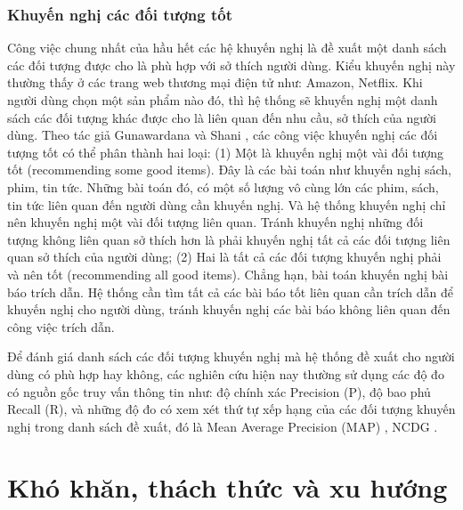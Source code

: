 \subsubsection{Khuyến nghị các đối tượng tốt}
Công việc chung nhất của hầu hết các hệ khuyến nghị là đề xuất một danh sách các đối tượng được cho là phù hợp với sở thích người dùng. Kiểu khuyến nghị này thường thấy ở các trang web thương mại điện tử như: Amazon, Netflix. Khi người dùng chọn một sản phẩm nào đó, thì hệ thống sẽ khuyến nghị một danh sách các đối tượng khác được cho là liên quan đến nhu cầu, sở thích của người dùng. Theo tác giả Gunawardana và Shani \cite{GunawardanaS09}, các công việc khuyến nghị các đối tượng tốt có thể phân thành hai loại: (1) Một là khuyến nghị một vài đối tượng tốt (recommending some good items). Đây là các bài toán như khuyến nghị sách, phim, tin tức. Những bài toán đó, có một số lượng vô cùng lớn các phim, sách, tin tức liên quan đến người dùng cần khuyến nghị. Và hệ thống khuyến nghị chỉ nên khuyến nghị một vài đối tượng liên quan. Tránh khuyến nghị những đối tượng không liên quan sở thích hơn là phải khuyến nghị tất cả các đối tượng liên quan sở thích của người dùng; (2) Hai là tất cả các đối tượng khuyến nghị phải và nên tốt (recommending all good items). Chẳng hạn, bài toán khuyến nghị bài báo trích dẫn. Hệ thống cần tìm tất cả các bài báo tốt liên quan cần trích dẫn để khuyến nghị cho người dùng, tránh khuyến nghị các bài báo không liên quan đến công việc trích dẫn.

Để đánh giá danh sách các đối tượng khuyến nghị mà hệ thống đề xuất cho người dùng có phù hợp hay không, các nghiên cứu hiện nay thường sử dụng các độ đo có nguồn gốc truy vấn thông tin như: độ chính xác Precision (P), độ bao phủ Recall (R), và những độ đo có xem xét thứ tự xếp hạng của các đối tượng khuyến nghị trong danh sách đề xuất, đó là Mean Average Precision (MAP) \cite{Yue:2007:SVM:MAP}, NCDG \cite{Jarvelin:2000:IEM:NDCG}.

\section{Khó khăn, thách thức và xu hướng}
